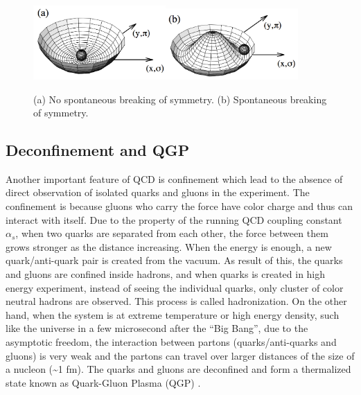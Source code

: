 \begin{figure}
\begin{centering}
\includegraphics[width=0.45\textwidth,height=0.16\paperheight]{fig/1.Introduction/nosbcs}\includegraphics[width=0.45\textwidth,height=0.16\paperheight]{fig/1.Introduction/sbcs}
\par\end{centering}

\protect\caption{(a) No spontaneous breaking of symmetry. (b) Spontaneous breaking
of symmetry.}


\label{fig:sbsc}
\end{figure}



\subsection{Deconfinement and QGP}

Another important feature of QCD is confinement which lead to the
absence of direct observation of isolated quarks and gluons in the
experiment. The confinement is because gluons who carry the force
have color charge and thus can interact with itself. Due to the property
of the running QCD coupling constant $\alpha_{s}$, when two quarks
are separated from each other, the force between them grows stronger
as the distance increasing. When the energy is enough, a new quark/anti-quark
pair is created from the vacuum. As result of this, the quarks and
gluons are confined inside hadrons, and when quarks is created in
high energy experiment, instead of seeing the individual quarks, only
cluster of color neutral hadrons are observed. This process is called
hadronization. On the other hand, when the system is at extreme temperature
or high energy density, such like the universe in a few microsecond
after the ``Big Bang'', due to the asymptotic freedom, the interaction
between partons (quarks/anti-quarks and gluons) is very weak and the
partons can travel over larger distances of the size of a nucleon
(\textasciitilde{}1 fm). The quarks and gluons are deconfined and
form a thermalized state known as Quark-Gluon Plasma (QGP) \cite{PhysRevLett.34.1353}.

